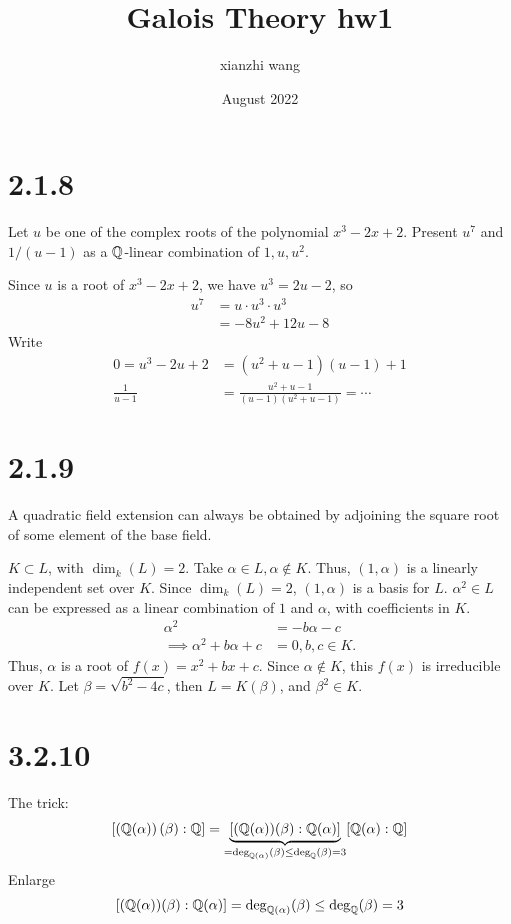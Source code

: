 \documentclass[12pt,english]{article}
\title{Galois Theory hw1}
\author{xianzhi wang}
\date{August 2022}
\begin{document}
\maketitle

\section*{2.1.8}
\begin{question}
    Let $u$ be one of the complex roots of the polynomial $x^3-2x+2$. Present $u^7$ and $1/(u-1)$ as a $\mathbb{Q}$-linear combination of $1,u,u^2$.
\end{question}

Since $u$ is a root of $x^3-2x+2$, we have $u^3 = 2u-2$, so
\begin{align*}
    u^7 &= u \cdot u^3 \cdot u^3\\
    &= -8u^2+12u-8
\end{align*}
Write
\begin{align*}
0 = u^3-2u+2 &= (u^2+u-1)(u-1)+1\\
    \frac{1}{u-1} &= \frac{u^2+u-1}{(u-1)(u^2+u-1)} = \cdots
\end{align*}

\section*{2.1.9}
\begin{proposition}
A quadratic field extension can always be obtained by adjoining the square root of some element of the base field. 
\end{proposition}
$K \subset L$, with $\dim_k(L) = 2$. Take $\alpha \in L, \alpha \not\in K$. Thus, $(1,\alpha)$ is a linearly independent set over $K$. Since $\dim_k(L) = 2$, $(1,\alpha)$ is a basis for $L$. $\alpha^2 \in L$ can be expressed as a linear combination of $1$ and $\alpha$, with coefficients in $K$.
\begin{align}
    \alpha^2 &= -b\alpha-c\\
    \implies \alpha^2 + b\alpha +c &= 0, b,c \in K.
\end{align} Thus, $\alpha$ is a root of $f(x) = x^2+bx+c$. Since $\alpha \not\in K$, this $f(x)$ is irreducible over $K$. Let $\beta = \sqrt{b^2-4c}$, then $L = K(\beta)$, and $\beta^2 \in K$.

\section*{3.2.10}
The trick:
\begin{align*}
    \left[ \left( \mathbb{Q}(\alpha) \right)(\beta):\mathbb{Q} \right] = \underbrace{\left[ (\mathbb{Q}(\alpha))(\beta):\mathbb{Q}(\alpha) \right]}_{= \deg_{\mathbb{Q}(\alpha)}(\beta)\leq \deg_{\mathbb{Q}}(\beta)=3} [\mathbb{Q}(\alpha):\mathbb{Q}]
\end{align*} Enlarge
\begin{align*}
     \left[ (\mathbb{Q}(\alpha))(\beta):\mathbb{Q}(\alpha) \right]= \deg_{\mathbb{Q}(\alpha)}(\beta)\leq \deg_{\mathbb{Q}}(\beta)=3
\end{align*}
\end{document}

